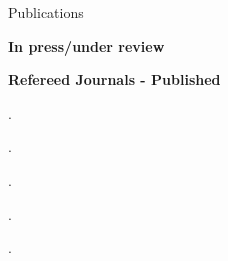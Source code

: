 \begin{rSection}{Publications}
\vspace{1em}
\begin{etaremune}
\item {}
\item {}
\item {}
\item {}

\vspace{1em}
{\large \textbf {In press/under review}}
\vspace{1em}
\item {}
\item {}
\item {}
\item {}
\vspace{1em}

{\large \textbf {Refereed Journals - Published}}
\vspace{1em}

\item {} \href{https://doi.org/10.1080/26410397.2023.2267893}{\textcolor{mydoi}{\aiDoi}} 

\item {}. \href{https://doi.org/10.29173/iq1044}{\textcolor{mydoi}{\aiDoi}} 

\item {}. \href{https://doi.org/10.1080/13548506.2022.2108079}{\textcolor{mydoi}{\aiDoi}} 

\item {}. \href{https://www.ssph-journal.org/articles/10.3389/ijph.2022.1604341/full}{\textcolor{mydoi}{\aiDoi}} 

\item {}. \href{https://doi.org/10.1016/j.jadohealth.2022.04.010}{\textcolor{mydoi}{\aiDoi}} 

\item {}. \href{https://doi.org/10.1080/13548506.2022.2108083}{\textcolor{mydoi}{\aiDoi}} 


\end{etaremune}
\end{rSection}
